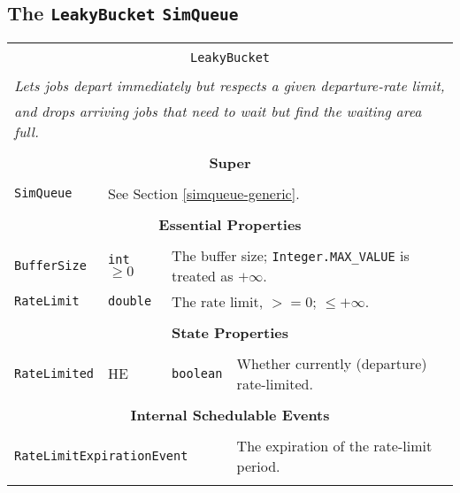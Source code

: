 \documentclass[12pt]{book}
\begin{document}
\subsection{The \lstinline{LeakyBucket} \lstinline{SimQueue}}

\begin{tabular}{|l|l|l|l|}
\hline
\multicolumn{4}{|c|}{} \\
\multicolumn{4}{|c|}{\lstinline[basicstyle=\large]{LeakyBucket}} \\
\multicolumn{4}{|c|}{} \\
\hline
\multicolumn{4}{|l|}{\em Lets jobs depart immediately but respects a given departure-rate limit,} \\
\multicolumn{4}{|l|}{\em and drops arriving jobs that need to wait but find the waiting area full.} \\
\hline
\multicolumn{4}{|c|}{} \\
\multicolumn{4}{|c|}{\bf Super} \\
\multicolumn{4}{|c|}{} \\
\hline
\lstinline|SimQueue| & \multicolumn{3}{|l|}{See Section \ref{simqueue-generic}.} \\
\hline
\multicolumn{4}{|c|}{} \\
\multicolumn{4}{|c|}{\bf Essential Properties} \\
\multicolumn{4}{|c|}{} \\
\hline
\lstinline|BufferSize| & \lstinline|int| $\geq 0$
                       & \multicolumn{2}{|l|}{The buffer size; \lstinline|Integer.MAX_VALUE| is treated as $+\infty$.} \\
\hline
\lstinline|RateLimit|  & \lstinline|double| & \multicolumn{2}{|l|}{The rate limit, $>= 0$; $\leq +\infty$.} \\
\hline
\multicolumn{4}{|c|}{} \\
\multicolumn{4}{|c|}{\bf State Properties} \\
\multicolumn{4}{|c|}{} \\
\hline
\lstinline|RateLimited| & HE & \lstinline|boolean| & Whether currently (departure) rate-limited. \\
\hline
\multicolumn{4}{|c|}{} \\
\multicolumn{4}{|c|}{\bf Internal Schedulable Events} \\
\multicolumn{4}{|c|}{} \\
\hline
\multicolumn{3}{|l|}{\lstinline|RateLimitExpirationEvent|} & The expiration of the rate-limit period. \\
\hline
\multicolumn{4}{|c|}{} \\

\end{tabular}
\end{document}
